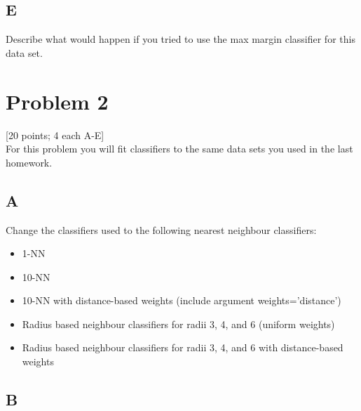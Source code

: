 \documentclass[12pt]{article}
\begin{document}
\subsection{E}
Describe what would happen if you tried to use the max margin classifier for this data set.


\section{Problem 2}
 [20 points; 4 each A-E]\\
For this problem you will fit classifiers to the same data sets you used in the last homework.
\subsection{A}
Change the classifiers used to the following nearest neighbour classifiers:\\
\begin{itemize}
    \item 1-NN
    \item 10-NN
    \item 10-NN with distance-based weights (include argument weights='distance')
    \item Radius based neighbour classifiers for radii 3, 4, and 6 (uniform weights)
    \item Radius based neighbour classifiers for radii 3, 4, and 6 with distance-based weights
\end{itemize}

\subsection{B}









\end{document}
